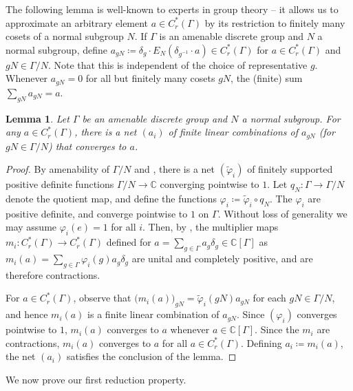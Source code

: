 \documentclass[11pt, oneside, reqno]{amsart}
\newtheorem{lem}[thm]{Lemma}
\theoremstyle{definition}
\theoremstyle{remark}
\numberwithin{equation}{section}
\begin{document}
\vspace{0.3cm}
The following lemma is well-known to experts in group theory -- it allows us to approximate an arbitrary element $a\in C^{*}_{r}(\Gamma)$ by its restriction to finitely many cosets of a normal subgroup $N$. If $\Gamma$ is an amenable discrete group and $N$ a normal subgroup, define $a_{gN} \coloneq \delta_{g}\cdot E_{N}(\delta_{g^{-1}}\cdot a)\in C^{*}_{r}(\Gamma)$ for $a\in C^{*}_{r}(\Gamma)$ and $gN\in\Gamma/N$. Note that this is independent of the choice of representative $g$. Whenever $a_{gN} = 0$ for all but finitely many cosets $gN$, the (finite) sum $\sum_{gN}a_{gN} = a$.

\begin{lem}
\label{lem:Folner}
    Let $\Gamma$ be an amenable discrete group and $N$ a normal subgroup. For any $a\in C^{*}_{r}(\Gamma)$, there is a net $(a_{i})$ of finite linear combinations of $a_{gN}$ (for $gN\in \Gamma/N$) that converges to $a$.
\end{lem}
\begin{proof}
    By amenability of $\Gamma/N$ and \cite[Theorem~2.6.8]{BO08}, there is a net $(\tilde{\varphi}_{i})$ of finitely supported positive definite functions $\Gamma/N\to\mathbb{C}$ converging pointwise to $1$. Let $q_N \colon \Gamma \to \Gamma/N$ denote the quotient map, and define the functions $\varphi_{i} \coloneq \tilde{\varphi}_{i}\circ q_N$. The $\varphi_i$ are positive definite, and converge pointwise to $1$ on $\Gamma$. Without loss of generality we may assume $\varphi_{i}(e) = 1$ for all $i$. Then, by \cite[Theorem~2.5.11(4)]{BO08}, the multiplier maps $m_{i} \colon C^{*}_{r}(\Gamma)\to C^{*}_{r}(\Gamma)$ defined for $a = \sum_{g\in\Gamma}a_{g}\delta_{g}\in\mathbb{C}[\Gamma]$ as $m_{i}(a) = \sum_{g\in\Gamma} \varphi_{i}(g) a_g \delta_{g}$ are unital and completely positive, and are therefore contractions. 
    
    For $a \in C^*_r(\Gamma)$, observe that $\big(m_i(a)\big)_{gN} = \tilde{\varphi}_{i}(gN)a_{gN}$ for each $gN\in\Gamma/N$, and hence $m_i(a)$ is a finite linear combination of $a_{gN}$. Since $(\varphi_{i})$ converges pointwise to $1$, $m_i(a)$ converges to $a$ whenever $a\in\mathbb{C}[\Gamma]$. Since the $m_{i}$ are contractions, $m_i(a)$ converges to $a$ for all $a\in C^{*}_{r}(\Gamma)$. Defining $a_i \coloneq m_i(a)$, the net $(a_{i})$ satisfies the conclusion of the lemma.
\end{proof}

We now prove our first reduction property.
\end{document}
